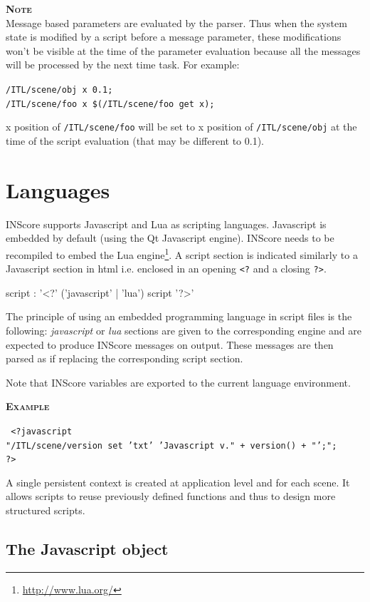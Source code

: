\documentclass[a4paper,twoside]{report}
\newcommand{\sublevel}[1]	{\section{#1}}
\newcommand{\subsublevel}[1]	{\subsection{#1}}
\newcommand{\OSC}[1]		{\texttt{#1}}
\newcommand{\example}		{\textbf{\hspace{-1.5cm}\textbf{\textsc{Example }}}}
\newcommand{\note}	[1]		{\vspace{2mm}\textbf{\hspace{-1.03cm}\textbf{\textsc{Note #1}}}}
\newcommand{\sample}	[1]			{\vspace{-2mm}\begin{center}\colorbox{mygrey}{
								\begin{minipage}[t]{0.9\columnwidth} 
								{\small \texttt{#1}}
								\end{minipage}}\end{center}}
\begin{document}
\note{}\\
Message based parameters are evaluated by the parser. Thus when the system state is modified by a script before a message parameter, these modifications won't be visible at the time of the parameter evaluation because all the messages will be processed by the next time task. For example:\\
\sample{/ITL/scene/obj x 0.1;\\
/ITL/scene/foo x \$(/ITL/scene/foo get x);}
x position of \OSC{/ITL/scene/foo} will be set to x position of \OSC{/ITL/scene/obj} at the time of the script evaluation (that may be different to 0.1).

\sublevel{Languages}\label{scriptlang}


INScore supports Javascript and Lua as scripting languages. Javascript is embedded by default (using the Qt Javascript engine). INScore needs to be recompiled to embed the Lua engine\footnote{\url{http://www.lua.org/}}. A script section is indicated similarly to a Javascript section in html i.e. enclosed in an opening \OSC{<?} and a closing \OSC{?>}.
\begin{rail} 
script : '<?' ('javascript' | 'lua') script '?>'
\end{rail}

The principle of using an embedded programming language in script files is the following: \emph{javascript} or \emph{lua} sections are given to the corresponding engine and are expected to produce INScore messages on output.
These messages are then parsed as if replacing the corresponding script section.

Note that INScore variables are exported to the current language environment.

\example
\sample{
<?javascript \\
\hspace*{3mm} "/ITL/scene/version set 'txt' 'Javascript v."  + version() + "';"; \\
\hspace*{1mm} ?>
}


A single persistent context is created at application level and for each scene.
It allows scripts to reuse previously defined functions and thus to design more structured scripts.


\subsublevel{The Javascript object}\label{jsobj}
\end{document}
